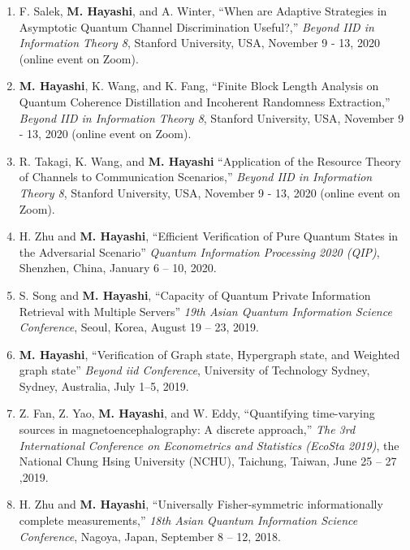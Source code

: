 \documentclass[a4paper,12pt,oneside]{article}
\begin{document}
\begin{enumerate}
\item
F. Salek, \textbf{M. Hayashi}, and A. Winter,
``When are Adaptive Strategies in Asymptotic Quantum Channel Discrimination Useful?,''
{\em Beyond IID in Information Theory 8}, Stanford University, USA, November 9 - 13, 2020 (online event on Zoom).

\item
\textbf{M. Hayashi}, K. Wang, and K. Fang,
``Finite Block Length Analysis on Quantum Coherence Distillation and Incoherent Randomness Extraction,''
{\em Beyond IID in Information Theory 8}, Stanford University, USA, November 9 - 13, 2020 (online event on Zoom).

\item
R. Takagi, K. Wang, and \textbf{M. Hayashi} 
``Application of the Resource Theory of Channels to Communication Scenarios,''
{\em Beyond IID in Information Theory 8}, Stanford University, USA, November 9 - 13, 2020 (online event on Zoom).

\item 
H. Zhu and \textbf{M. Hayashi}, 
``Efficient Verification of Pure Quantum States in the Adversarial Scenario''
{\em Quantum Information Processing 2020 (QIP)}, 
Shenzhen, China, January 6 -- 10, 2020.


\item 
S. Song and \textbf{M. Hayashi}, 
``Capacity of Quantum
Private Information Retrieval with Multiple Servers''
{\em 19th Asian Quantum Information Science Conference},
Seoul, Korea, August 19 -- 23, 2019.

\item 
\textbf{M. Hayashi}, 
``Verification of Graph state, Hypergraph state, and Weighted graph state''
{\em Beyond iid Conference},
University of Technology Sydney, Sydney, Australia, 
July 1--5, 2019.

\item 
Z. Fan, Z. Yao, \textbf{M. Hayashi}, and W. Eddy,
``Quantifying time-varying sources in magnetoencephalography: A discrete approach,''
{\em The 3rd International Conference on Econometrics and Statistics (EcoSta 2019)},
the National Chung Hsing University (NCHU), Taichung, Taiwan, June 25 -- 27 ,2019.

\item 
H. Zhu and \textbf{M. Hayashi},
``Universally Fisher-symmetric informationally complete measurements,''
{\em 18th Asian Quantum Information Science Conference},
Nagoya, Japan, September 8 -- 12, 2018.


\end{enumerate}
\end{document}
